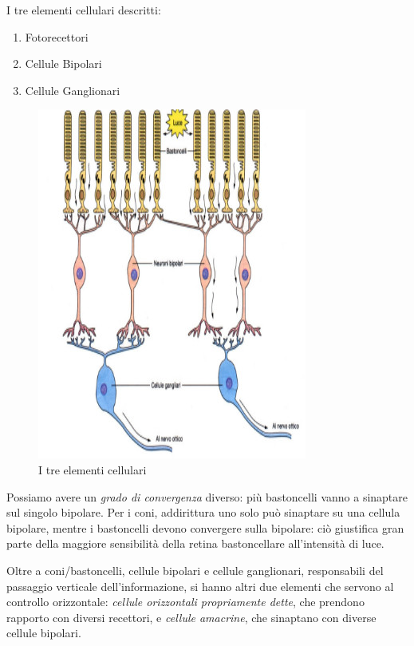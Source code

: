 \documentclass[a4paper,12pt]{article}
\begin{document}
I tre elementi cellulari descritti: 
\begin{enumerate}
\item{Fotorecettori}
\item{Cellule Bipolari}
\item{Cellule Ganglionari}
\end{enumerate} 

\begin{figure}[H]
\centering
\includegraphics[scale=0.4]{immagine/tipi.jpg}
\caption{I tre elementi cellulari}
\end{figure}

Possiamo avere un \emph{grado di convergenza} diverso: più bastoncelli vanno a sinaptare sul singolo bipolare. Per i coni, addirittura uno solo può sinaptare su una cellula bipolare, mentre i bastoncelli devono convergere sulla bipolare: ciò giustifica gran parte della maggiore sensibilità della retina bastoncellare all'intensità di luce.

Oltre a coni/bastoncelli, cellule bipolari e cellule ganglionari, responsabili del passaggio verticale dell'informazione, si hanno altri due elementi che servono al controllo orizzontale: \emph{cellule orizzontali propriamente dette}, che prendono rapporto con diversi recettori, e \emph{cellule amacrine}, che sinaptano con diverse cellule bipolari. 
\end{document}

